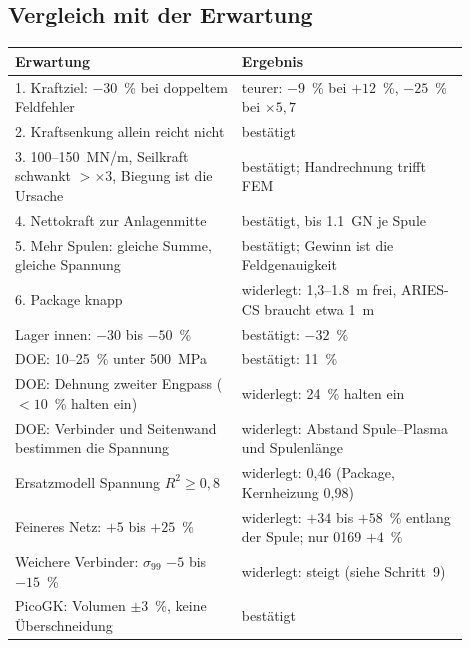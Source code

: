 \subsection*{Vergleich mit der Erwartung}
\begin{center}\small
\begin{tabular}{p{0.45\linewidth}p{0.45\linewidth}}
\toprule
Erwartung & Ergebnis \\
\midrule
1. Kraftziel: $-30$~\% bei doppeltem Feldfehler & teurer: $-9$~\% bei $+12$~\%, $-25$~\% bei $\times5{,}7$ \\
2. Kraftsenkung allein reicht nicht & bestätigt \\
3. 100--150~MN/m, Seilkraft schwankt $>\times3$, Biegung ist die Ursache & bestätigt; Handrechnung trifft FEM \\
4. Nettokraft zur Anlagenmitte & bestätigt, bis \SI{1,1}{GN} je Spule \\
5. Mehr Spulen: gleiche Summe, gleiche Spannung & bestätigt; Gewinn ist die Feldgenauigkeit \\
6. Package knapp & widerlegt: 1,3--\SI{1,8}{m} frei, ARIES-CS braucht etwa \SI{1}{m} \\
Lager innen: $-30$ bis $-50$~\% & bestätigt: $-32$~\% \\
DOE: 10--25~\% unter \SI{500}{MPa} & bestätigt: 11~\% \\
DOE: Dehnung zweiter Engpass ($<10$~\% halten ein) & widerlegt: 24~\% halten ein \\
DOE: Verbinder und Seitenwand bestimmen die Spannung & widerlegt: Abstand Spule--Plasma und Spulenlänge \\
Ersatzmodell Spannung $R^2\ge0{,}8$ & widerlegt: 0,46 (Package, Kernheizung 0,98) \\
Feineres Netz: $+5$ bis $+25$~\% & widerlegt: $+34$ bis $+58$~\% entlang der Spule; nur 0169 $+4$~\% \\
Weichere Verbinder: $\sigma_{99}$ $-5$ bis $-15$~\% & widerlegt: steigt (siehe Schritt~9) \\
PicoGK: Volumen $\pm3$~\%, keine Überschneidung & bestätigt \\
\bottomrule
\end{tabular}
\end{center}

